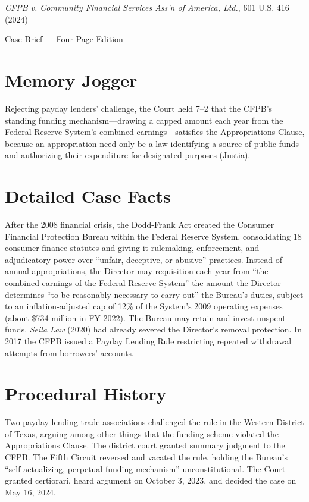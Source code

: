 \documentclass[12pt]{article}
\begin{document}
\begin{center}
{\LARGE \textit{CFPB v. Community Financial Services Ass'n of America, Ltd.}, 601 U.S. 416 (2024)\par}
\vspace{0.8em}
{\large Case Brief --- Four-Page Edition\par}
\end{center}
\vspace{1em}

\section{Memory Jogger}

Rejecting payday lenders' challenge, the Court held 7--2 that the CFPB's standing funding mechanism---drawing a capped amount each year from the Federal Reserve System's combined earnings---satisfies the Appropriations Clause, because an appropriation need only be a law identifying a source of public funds and authorizing their expenditure for designated purposes (\href{https://supreme.justia.com/cases/federal/us/601/22-448/}{Justia}).

\section{Detailed Case Facts}

After the 2008 financial crisis, the Dodd-Frank Act created the Consumer Financial Protection Bureau within the Federal Reserve System, consolidating 18 consumer-finance statutes and giving it rulemaking, enforcement, and adjudicatory power over ``unfair, deceptive, or abusive'' practices. Instead of annual appropriations, the Director may requisition each year from ``the combined earnings of the Federal Reserve System'' the amount the Director determines ``to be reasonably necessary to carry out'' the Bureau's duties, subject to an inflation-adjusted cap of 12\% of the System's 2009 operating expenses (about \$734 million in FY 2022). The Bureau may retain and invest unspent funds. \textit{Seila Law} (2020) had already severed the Director's removal protection. In 2017 the CFPB issued a Payday Lending Rule restricting repeated withdrawal attempts from borrowers' accounts.

\section{Procedural History}

Two payday-lending trade associations challenged the rule in the Western District of Texas, arguing among other things that the funding scheme violated the Appropriations Clause. The district court granted summary judgment to the CFPB. The Fifth Circuit reversed and vacated the rule, holding the Bureau's ``self-actualizing, perpetual funding mechanism'' unconstitutional. The Court granted certiorari, heard argument on October 3, 2023, and decided the case on May 16, 2024.
\end{document}
